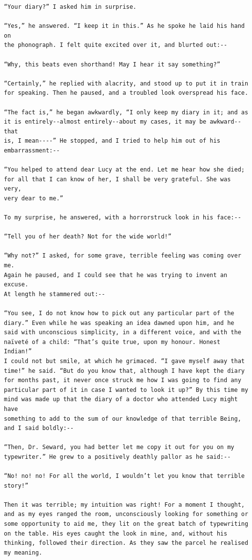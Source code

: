 \documentclass{article}
\begin{document}
\begin{verbatim}
“Your diary?” I asked him in surprise.

“Yes,” he answered. “I keep it in this.” As he spoke he laid his hand on
the phonograph. I felt quite excited over it, and blurted out:--

“Why, this beats even shorthand! May I hear it say something?”

“Certainly,” he replied with alacrity, and stood up to put it in train
for speaking. Then he paused, and a troubled look overspread his face.

“The fact is,” he began awkwardly, “I only keep my diary in it; and as
it is entirely--almost entirely--about my cases, it may be awkward--that
is, I mean----” He stopped, and I tried to help him out of his
embarrassment:--

“You helped to attend dear Lucy at the end. Let me hear how she died;
for all that I can know of her, I shall be very grateful. She was very,
very dear to me.”

To my surprise, he answered, with a horrorstruck look in his face:--

“Tell you of her death? Not for the wide world!”

“Why not?” I asked, for some grave, terrible feeling was coming over me.
Again he paused, and I could see that he was trying to invent an excuse.
At length he stammered out:--

“You see, I do not know how to pick out any particular part of the
diary.” Even while he was speaking an idea dawned upon him, and he
said with unconscious simplicity, in a different voice, and with the
naïveté of a child: “That’s quite true, upon my honour. Honest Indian!”
I could not but smile, at which he grimaced. “I gave myself away that
time!” he said. “But do you know that, although I have kept the diary
for months past, it never once struck me how I was going to find any
particular part of it in case I wanted to look it up?” By this time my
mind was made up that the diary of a doctor who attended Lucy might have
something to add to the sum of our knowledge of that terrible Being,
and I said boldly:--

“Then, Dr. Seward, you had better let me copy it out for you on my
typewriter.” He grew to a positively deathly pallor as he said:--

“No! no! no! For all the world, I wouldn’t let you know that terrible
story!”

Then it was terrible; my intuition was right! For a moment I thought,
and as my eyes ranged the room, unconsciously looking for something or
some opportunity to aid me, they lit on the great batch of typewriting
on the table. His eyes caught the look in mine, and, without his
thinking, followed their direction. As they saw the parcel he realised
my meaning.


\end{verbatim}
\end{document}
